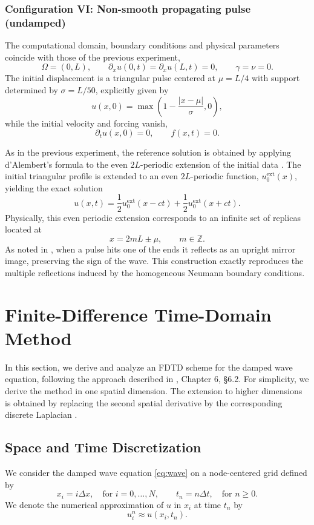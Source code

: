 \documentclass{Configuration_Files/PoliMi3i_thesis}
\begin{document}
\subsubsection{Configuration VI: Non-smooth propagating pulse (undamped)}
The computational domain, boundary conditions and physical parameters coincide with those of the previous experiment,
\[
\Omega=(0,L),\qquad
\partial_xu(0,t)=\partial_xu(L,t)=0,\qquad
\gamma=\nu=0.
\]
The initial displacement is a triangular pulse centered at $\mu = L/4$ with support determined by $\sigma = L/50$, explicitly given by
\[
u(x,0) = \max\left(1 - \frac{|x-\mu|}{\sigma}, 0\right),
\]
while the initial velocity and forcing vanish,
\[
\partial_tu(x,0)=0,
\qquad
f(x,t)=0.
\]

As in the previous experiment, the reference solution is obtained by applying d'Alembert's formula to the even $2L$-periodic extension of the initial data \cite[Sec.~4.2]{olver_introduction_2014}. The initial triangular profile is extended to an even $2L$-periodic function, $u_0^{\mathrm{ext}}(x)$, yielding the exact solution
\[
u(x,t)
=
\frac12
u_0^{\mathrm{ext}}(x-ct)
+
\frac12
u_0^{\mathrm{ext}}(x+ct).
\]
Physically, this even periodic extension corresponds to an infinite set of replicas located at
\[
x=2mL\pm\mu,
\qquad
m\in\mathbb Z.
\]
As noted in \cite[Sec.~4.2]{olver_introduction_2014}, when a pulse hits one of the ends it reflects as an upright mirror image, preserving the sign of the wave. This construction exactly reproduces the multiple reflections induced by the homogeneous Neumann boundary conditions. 



\section{Finite-Difference Time-Domain Method}
In this section, we derive and analyze an FDTD scheme for the damped wave equation, following the approach described in \cite{bilbao_numerical_2009}, Chapter 6, \S6.2. For simplicity, we derive the method in one spatial dimension. The extension to higher dimensions is obtained by replacing the second spatial derivative by the corresponding discrete Laplacian \cite[Chapter 11]{bilbao_numerical_2009}.


\subsection{Space and Time Discretization}
We consider the damped wave equation \eqref{eq:wave} on a node-centered grid defined by
\[
x_i=i\Delta x, \quad \text{for } i = 0, \dots, N, \qquad t_n=n\Delta t, \quad \text{for } n \ge 0.
\]
We denote the numerical approximation of $u$ in $x_i$ at time $t_n$ by
\[
u_i^n\approx u(x_i,t_n).
\]
\end{document}
